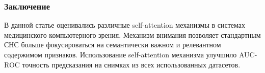 \subsubsection*{Заключение}
В данной статье оценивались различные self-attention механизмы в 
системах медицинского компьютерного зрения. Механизм внимания позволяет 
стандартным СНС больше фокусироваться на семантически важном и релевантном 
содержимом признаков. Использование self-attention механизма улучшило AUC-ROC  
точность предсказания на снимках из всех использованных датасетов. 
